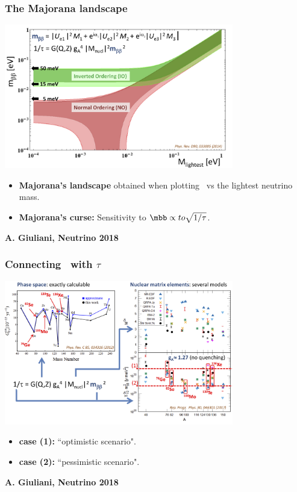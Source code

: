\begin{frame}
\frametitle{The Majorana landscape} 
 \begin{center}
\includegraphics[width=0.75\textwidth]{moriond/landscape.png}
\end{center}
\begin{itemize}
\item {\bf Majorana's  landscape} obtained when plotting \mbb\ vs the lightest neutrino mass.
\item {\bf Majorana's curse:} Sensitivity to $\mbb \propto to \sqrt{1/\tau}$.
\end{itemize}
 \begin{flushright}
{\bf A. Giuliani, Neutrino 2018}
\end{flushright}

\end{frame}

\begin{frame}
\frametitle{Connecting \mbb\ with $\tau$} 
 \begin{center}
\includegraphics[width=0.75\textwidth]{moriond/nme.png}
\end{center}
\begin{itemize}
\item {\bf case (1):} ``optimistic scenario".
\item {\bf case (2):} ``pessimistic scenario".
\end{itemize}
 \begin{flushright}
{\bf A. Giuliani, Neutrino 2018}
\end{flushright}
\end{frame}


